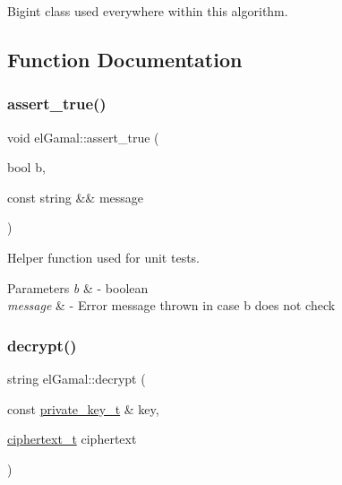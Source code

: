 Bigint class used everywhere within this algorithm. 



\subsection{Function Documentation}
\mbox{\label{namespaceelGamal_a1be22a37709d73fbc4580b00a396c0b9}} 
\subsubsection{\texorpdfstring{assert\+\_\+true()}{assert\_true()}}
{\footnotesize\ttfamily void el\+Gamal\+::assert\+\_\+true (\begin{DoxyParamCaption}\item[{bool}]{b,  }\item[{const string \&\&}]{message }\end{DoxyParamCaption})}



Helper function used for unit tests. 


\begin{DoxyParams}{Parameters}
{\em b} & -\/ boolean \\
\hline
{\em message} & -\/ Error message thrown in case b does not check \\
\hline
\end{DoxyParams}
\mbox{\label{namespaceelGamal_a7d43bd19f4fbfe6cca1232a7b2f23af6}} 
\subsubsection{\texorpdfstring{decrypt()}{decrypt()}}
{\footnotesize\ttfamily string el\+Gamal\+::decrypt (\begin{DoxyParamCaption}\item[{const \mbox{\hyperlink{structelGamal_1_1private__key__t}{private\+\_\+key\+\_\+t}} \&}]{key,  }\item[{\mbox{\hyperlink{structelGamal_1_1ciphertext__t}{ciphertext\+\_\+t}}}]{ciphertext }\end{DoxyParamCaption})}



